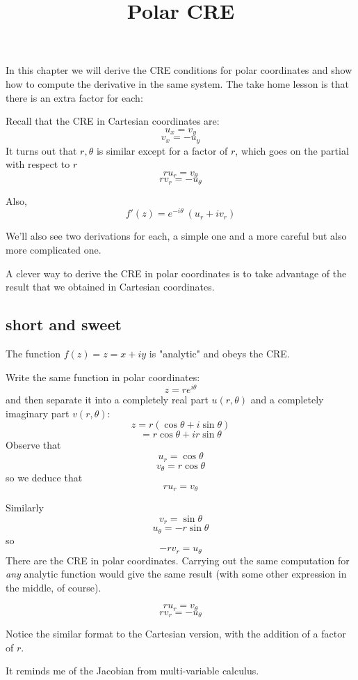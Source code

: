 \documentclass[11pt, oneside]{article}
\title{Polar CRE}
\date{}
\begin{document}
\maketitle
\Large


In this chapter we will derive the CRE conditions for polar coordinates and show how to compute the derivative in the same system.  The take home lesson is that there is an extra factor for each:

Recall that the CRE in Cartesian coordinates are:
\[ u_x = v_y \]
\[ v_x = -u_y \]
It turns out that $r,\theta$ is similar except for a factor of $r$, which goes on the partial with respect to $r$
\[ r u_r = v_{\theta} \]
\[ r v_r = - u_{\theta} \]

Also,
\[ f'(z) = e^{-i \theta} \ (u_r + i v_r) \]

We'll also see two derivations for each, a simple one and a more careful but also more complicated one. 

A clever way to derive the CRE in polar coordinates is to take advantage of the result that we obtained in Cartesian coordinates.

\subsection*{short and sweet}

The function $f(z) = z = x + iy$ is "analytic" and obeys the CRE.  

Write the same function in polar coordinates:
\[ z = re^{i \theta} \]
and then separate it into a completely real part $u(r, \theta)$ and a completely imaginary part $v(r,\theta)$:
\[ z = r(\cos \theta + i \sin \theta) \]
\[ = r \cos \theta + i r \sin \theta \]
Observe that
\[ u_r = \cos \theta \]
\[ v_{\theta} = r \cos \theta \]
so we deduce that
\[ r u_r =  v_{\theta} \]

Similarly
\[ v_r = \sin \theta \]
\[ u_{\theta} = - r \sin \theta \]
so
\[ -r v_r = u_{\theta} \]
There are the CRE in polar coordinates.  Carrying out the same computation for \emph{any} analytic function would give the same result (with some other expression in the middle, of course).

\[ r u_r = v_{\theta} \]
\[ r v_r = - u_{\theta} \]

Notice the similar format to the Cartesian version, with the addition of a factor of $r$.  

It reminds me of the Jacobian from multi-variable calculus.
\end{document}
